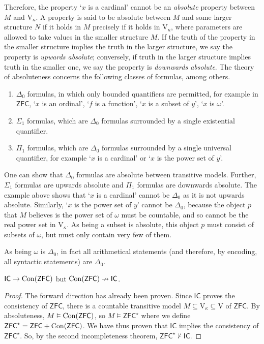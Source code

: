 Therefore, the property `\( x \) is a cardinal' cannot be an \emph{absolute} property between \( M \) and \( \mathrm{V}_\kappa \).
A property is said to be absolute between \( M \) and some larger structure \( N \) if it holds in \( M \) precisely if it holds in \( \mathrm{V}_\kappa \), where parameters are allowed to take values in the smaller structure \( M \).
If the truth of the property in the smaller structure implies the truth in the larger structure, we say the property is \emph{upwards absolute}; conversely, if truth in the larger structure implies truth in the smaller one, we say the property is \emph{downwards absolute}.
The theory of absoluteness concerns the following classes of formulas, among others.
\begin{enumerate}
    \item \( \Delta_0 \) formulas, in which only bounded quantifiers are permitted, for example in \( \mathsf{ZFC} \), `\( x \) is an ordinal', `\( f \) is a function', `\( x \) is a subset of \( y \)', `\( x \) is \( \omega \)'.
    \item \( \Sigma_1 \) formulas, which are \( \Delta_0 \) formulas surrounded by a single existential quantifier.
    \item \( \Pi_1 \) formulas, which are \( \Delta_0 \) formulas surrounded by a single universal quantifier, for example `\( x \) is a cardinal' or `\( x \) is the power set of \( y \)'.
\end{enumerate}
One can show that \( \Delta_0 \) formulas are absolute between transitive models.
Further, \( \Sigma_1 \) formulas are upwards absolute and \( \Pi_1 \) formulas are downwards absolute.
The example above shows that `\( x \) is a cardinal' cannot be \( \Delta_0 \) as it is not upwards absolute.
Similarly, `\( x \) is the power set of \( y \)' cannot be \( \Delta_0 \), because the object \( p \) that \( M \) believes is the power set of \( \omega \) must be countable, and so cannot be the real power set in \( \mathrm{V}_\kappa \).
As being a subset is absolute, this object \( p \) must consist of subsets of \( \omega \), but must only contain very few of them.

As being \( \omega \) is \( \Delta_0 \), in fact all arithmetical statements (and therefore, by encoding, all syntactic statements) are \( \Delta_0 \).
\begin{theorem}
    \( \mathsf{IC} \to \operatorname{Con}(\mathsf{ZFC}) \) but \( \operatorname{Con}(\mathsf{ZFC}) \nrightarrow \mathsf{IC} \).
\end{theorem}
\begin{proof}
    The forward direction has already been proven.
    Since \( \mathsf{IC} \) proves the consistency of \( \mathsf{ZFC} \), there is a countable transitive model \( M \subseteq \mathrm{V}_\kappa \subseteq \mathrm{V} \) of \( \mathsf{ZFC} \).
    By absoluteness, \( M \vDash \operatorname{Con}(\mathsf{ZFC}) \), so \( M \vDash \mathsf{ZFC}^\star \) where we define \( \mathsf{ZFC}^\star = \mathsf{ZFC} + \operatorname{Con}(\mathsf{ZFC}) \).
    We have thus proven that \( \mathsf{IC} \) implies the consistency of \( \mathsf{ZFC}^\star \).
    So, by the second incompleteness theorem, \( \mathsf{ZFC}^\star \nvdash \mathsf{IC} \).
\end{proof}

